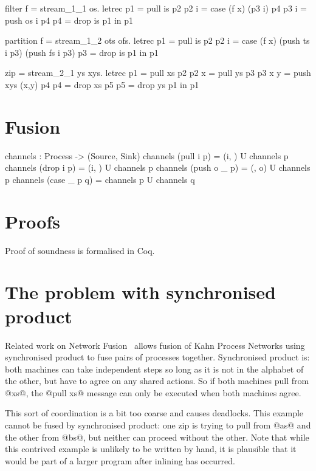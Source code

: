 \begin{code}
filter f = stream_1_1 \is os.
  letrec
    p1   = pull is p2
    p2 i = case (f x) (p3 i) p4
    p3 i = push os i p4
    p4   = drop is p1
  in p1
\end{code}

\begin{code}
partition f = stream_1_2 \is ots ofs.
  letrec
    p1   = pull is p2
    p2 i = case (f x)
            (push ts i p3)
            (push fs i p3)
    p3   = drop is p1
  in p1
\end{code}

\begin{code}
zip = stream_2_1 \xs ys xys.
  letrec
    p1     = pull xs        p2
    p2 x   = pull ys        p3
    p3 x y = push xys (x,y) p4
    p4     = drop xs        p5
    p5     = drop ys        p1
  in p1
\end{code}

\section{Fusion}
\label{s:Fusion}

\begin{code}
channels : Process -> ({Source}, {Sink})
channels (pull i   p) = ({i}, {})  U channels p
channels (drop i   p) = ({i}, {})  U channels p
channels (push o _ p) = ({}, {o})  U channels p
channels (case _ p q) = channels p U channels q
\end{code}



\section{Proofs}
\label{s:Proofs}
Proof of soundness is formalised in Coq.


\section{The problem with synchronised product}
Related work on Network Fusion~\cite{fradet2004network} allows fusion of Kahn Process Networks using synchronised product to fuse pairs of processes together.
Synchronised product is: both machines can take independent steps so long as it is not in the alphabet of the other, but have to agree on any shared actions.
So if both machines pull from @xs@, the @pull xs@ message can only be executed when both machines agree.

This sort of coordination is a bit too coarse and causes deadlocks.
This example cannot be fused by synchronised product: one zip is trying to pull from @as@ and the other from @bs@, but neither can proceed without the other.
Note that while this contrived example is unlikely to be written by hand, it is plausible that it would be part of a larger program after inlining has occurred.

